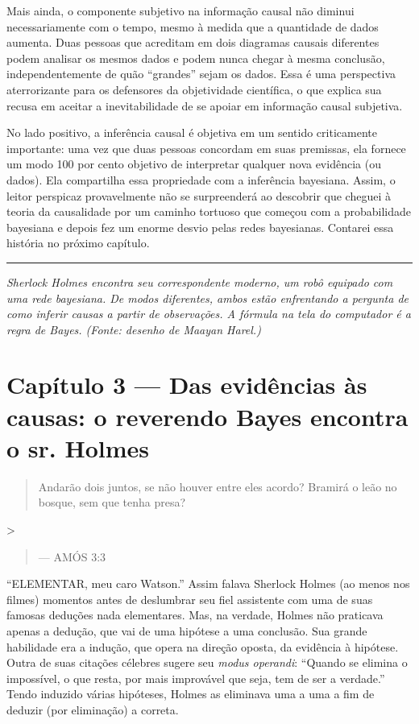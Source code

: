 \documentclass[11pt,a5paper,twoside]{book}
\begin{document}
Mais ainda, o componente subjetivo na informação causal não diminui necessariamente com o tempo, mesmo à medida que a quantidade de dados aumenta. Duas pessoas que acreditam em dois diagramas causais diferentes podem analisar os mesmos dados e podem nunca chegar à mesma conclusão, independentemente de quão “grandes” sejam os dados. Essa é uma perspectiva aterrorizante para os defensores da objetividade científica, o que explica sua recusa em aceitar a inevitabilidade de se apoiar em informação causal subjetiva.

No lado positivo, a inferência causal é objetiva em um sentido criticamente importante: uma vez que duas pessoas concordam em suas premissas, ela fornece um modo 100 por cento objetivo de interpretar qualquer nova evidência (ou dados). Ela compartilha essa propriedade com a inferência bayesiana. Assim, o leitor perspicaz provavelmente não se surpreenderá ao descobrir que cheguei à teoria da causalidade por um caminho tortuoso que começou com a probabilidade bayesiana e depois fez um enorme desvio pelas redes bayesianas. Contarei essa história no próximo capítulo.

\vspace{1em}\hrule\vspace{1em}
\textit{Sherlock Holmes encontra seu correspondente moderno, um robô equipado com uma rede bayesiana. De modos diferentes, ambos estão enfrentando a pergunta de como inferir causas a partir de observações. A fórmula na tela do computador é a regra de Bayes. (Fonte: desenho de Maayan Harel.)}

\chapter{Capítulo 3 — Das evidências às causas: o reverendo Bayes encontra o sr. Holmes}
\begin{quote}
Andarão dois juntos, se não houver entre eles acordo? Bramirá o leão no bosque, sem que tenha presa?
\end{quote}
>

\begin{quote}
— AMÓS 3:3
\end{quote}
“ELEMENTAR, meu caro Watson.” Assim falava Sherlock Holmes (ao menos nos filmes) momentos antes de deslumbrar seu fiel assistente com uma de suas famosas deduções nada elementares. Mas, na verdade, Holmes não praticava apenas a dedução, que vai de uma hipótese a uma conclusão. Sua grande habilidade era a indução, que opera na direção oposta, da evidência à hipótese. Outra de suas citações célebres sugere seu \textit{modus operandi}: “Quando se elimina o impossível, o que resta, por mais improvável que seja, tem de ser a verdade.” Tendo induzido várias hipóteses, Holmes as eliminava uma a uma a fim de deduzir (por eliminação) a correta.
\end{document}
